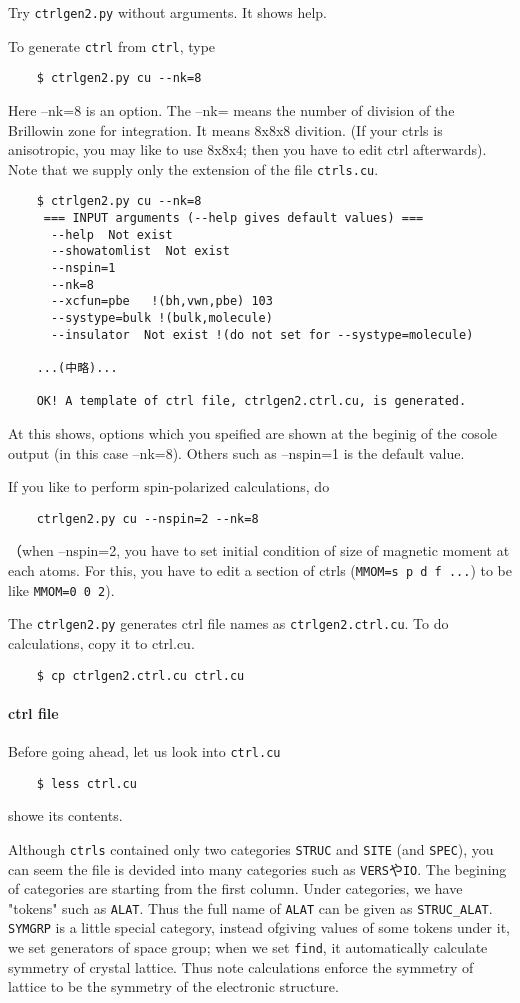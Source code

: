 \documentclass[a4paper,10pt,epsf,fleqn]{article}
\begin{document}
Try \verb+ctrlgen2.py+ without arguments. It shows help. 

To generate \verb+ctrl+ from \verb+ctrl+, type
\begin{verbatim}
    $ ctrlgen2.py cu --nk=8
\end{verbatim}
Here --nk=8 is an option.
The --nk= means the number of division of the Brillowin zone for
integration. It means 8x8x8 divition. (If your ctrls is anisotropic,
you may like to use 8x8x4; then you have to edit ctrl afterwards).
Note that we supply only the extension of the file \verb+ctrls.cu+.

\begin{verbatim}
    $ ctrlgen2.py cu --nk=8
     === INPUT arguments (--help gives default values) === 
      --help  Not exist
      --showatomlist  Not exist
      --nspin=1
      --nk=8
      --xcfun=pbe   !(bh,vwn,pbe) 103
      --systype=bulk !(bulk,molecule)
      --insulator  Not exist !(do not set for --systype=molecule)

    ...(中略)...

    OK! A template of ctrl file, ctrlgen2.ctrl.cu, is generated.
\end{verbatim}
At this shows,
options which you speified are shown at the beginig of the cosole output
(in this case --nk=8). Others such as --nspin=1 is the default value.

If you like to perform spin-polarized calculations,
do 
\begin{verbatim}
    ctrlgen2.py cu --nspin=2 --nk=8
\end{verbatim}
（when --nspin=2, you have to set initial condition of size of
magnetic moment at each atoms. For this, you have to edit
a section of ctrls (\verb+MMOM=s p d f ...+) to be like
\verb+MMOM=0 0 2+).

The \verb+ctrlgen2.py+ generates ctrl file names as
\verb+ctrlgen2.ctrl.cu+. To do calculations, 
copy it to ctrl.cu.
\begin{verbatim}
    $ cp ctrlgen2.ctrl.cu ctrl.cu
\end{verbatim}


\paragraph{ctrl file}
Before going ahead, let us look into \verb+ctrl.cu+
\begin{verbatim}
    $ less ctrl.cu
\end{verbatim}
showe its contents.

Although \verb+ctrls+ contained only two categories \verb+STRUC+ and
\verb+SITE+ (and \verb+SPEC+), you can seem the file is devided into
many categories such as \verb+VERS+や\verb+IO+. 
The begining of categories are starting from the first column.
Under categories, we have "tokens" such as \verb+ALAT+.
Thus the full name of \verb+ALAT+ can be given as \verb+STRUC_ALAT+.
\verb+SYMGRP+ is a little special category, instead ofgiving values of some tokens under it, we set
generators of space group; when we set \verb+find+,
it automatically calculate symmetry of crystal lattice.
Thus note calculations enforce the symmetry of lattice to be the
symmetry of the electronic structure.
\end{document}
